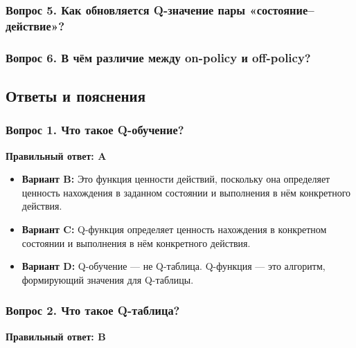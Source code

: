 \documentclass[11pt,a4paper]{article}
\begin{document}
\subsubsection{Вопрос 5. Как обновляется Q-значение пары «состояние--действие»?}\label{q5-how-do-we-update-the-q-value-of-a-state-action-pair}


\subsubsection{Вопрос 6. В чём различие между on-policy и off-policy?}\label{q6-whats-the-difference-between-on-policy-and-off-policy}

\subsection{Ответы и пояснения}\label{answer-key-and-explanations-1}

\subsubsection{Вопрос 1. Что такое Q-обучение?}\label{q1-what-is-q-learning-1}

\textbf{Правильный ответ: A}

\begin{itemize}
\item
  \textbf{Вариант B:} Это функция ценности действий, поскольку она определяет ценность нахождения в заданном состоянии и выполнения в нём конкретного действия.
\item
  \textbf{Вариант C:} Q-функция определяет ценность нахождения в конкретном состоянии и выполнения в нём конкретного действия.
\item
  \textbf{Вариант D:} Q-обучение --- не Q-таблица. Q-функция --- это алгоритм, формирующий значения для Q-таблицы.
\end{itemize}

\subsubsection{Вопрос 2. Что такое Q-таблица?}\label{q2-what-is-a-q-table-1}

\textbf{Правильный ответ: B}
\end{document}
